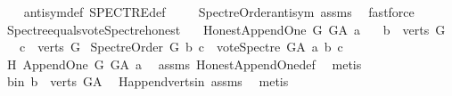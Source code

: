 \begin{isabellebody}
\ \ %
\endisadelimproof
%
\isatagproof
{}\isamarkupfalse%
\ antisym{\isacharunderscore}{\kern0pt}def\ SPECTRE{\isacharunderscore}{\kern0pt}def\ \isanewline
\ \ \isamarkupfalse%
\ Spectre{\isacharunderscore}{\kern0pt}Order{\isacharunderscore}{\kern0pt}antisym\ assms\ \isamarkupfalse%
\ fastforce%
\endisatagproof
{\isafoldproof}%
%
\isadelimproof
\isanewline
%
\endisadelimproof
\isanewline
\isanewline
{}\isamarkupfalse%
\ Spectre{\isacharunderscore}{\kern0pt}equals{\isacharunderscore}{\kern0pt}vote{\isacharunderscore}{\kern0pt}Spectre{\isacharunderscore}{\kern0pt}honest{\isacharcolon}{\kern0pt}\isanewline
\ \ \ {\isachardoublequoteopen}Honest{\isacharunderscore}{\kern0pt}Append{\isacharunderscore}{\kern0pt}One\ G\ G{\isacharunderscore}{\kern0pt}A\ a{\isachardoublequoteclose}\isanewline
\ \ \ {\isachardoublequoteopen}b\ {\isasymin}\ verts\ G{\isachardoublequoteclose}\isanewline
\ \ \ {\isachardoublequoteopen}c\ {\isasymin}\ verts\ G{\isachardoublequoteclose}\isanewline
{}\ {\isachardoublequoteopen}Spectre{\isacharunderscore}{\kern0pt}Order\ G\ b\ c\ {\isasymlongleftrightarrow}\ vote{\isacharunderscore}{\kern0pt}Spectre\ G{\isacharunderscore}{\kern0pt}A\ a\ b\ c\ {\isacharequal}{\kern0pt}\ {}{\isachardoublequoteclose}\isanewline
%
\isadelimproof
%
\endisadelimproof
%
\isatagproof
{}\isamarkupfalse%
\ {\isacharminus}{\kern0pt}\isanewline
\ \ \isamarkupfalse%
\ H{\isacharcolon}{\kern0pt}\ Append{\isacharunderscore}{\kern0pt}One\ {\isachardoublequoteopen}G{\isachardoublequoteclose}\ {\isachardoublequoteopen}G{\isacharunderscore}{\kern0pt}A{\isachardoublequoteclose}\ {\isachardoublequoteopen}a{\isachardoublequoteclose}\ \isamarkupfalse%
\ assms{\isacharparenleft}{\kern0pt}{}{\isacharparenright}{\kern0pt}\ Honest{\isacharunderscore}{\kern0pt}Append{\isacharunderscore}{\kern0pt}One{\isacharunderscore}{\kern0pt}def\ \isamarkupfalse%
\ metis\isanewline
\ \ \isamarkupfalse%
\ b{\isacharunderscore}{\kern0pt}in{\isacharcolon}{\kern0pt}\ {\isachardoublequoteopen}b\ {\isasymin}\ verts\ G{\isacharunderscore}{\kern0pt}A{\isachardoublequoteclose}\ \isamarkupfalse%
\ H{\isachardot}{\kern0pt}append{\isacharunderscore}{\kern0pt}verts{\isacharunderscore}{\kern0pt}in\ assms{\isacharparenleft}{\kern0pt}{}{\isacharparenright}{\kern0pt}\ \isamarkupfalse%
\ metis\isanewline
\ \ \isamarkupfalse%

\end{isabellebody}
